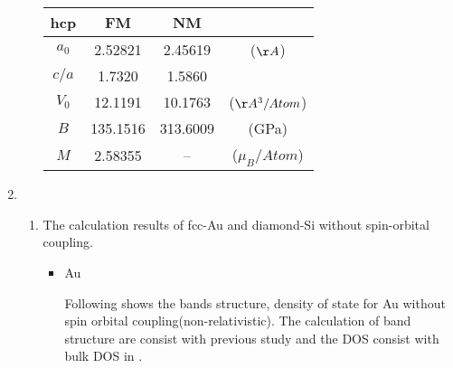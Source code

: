 \documentclass[notitlepage]{revtex4-1}
\begin{document}
\begin{CJK}{UTF8}{bsmi}
\begin{enumerate}
\begin{enumerate}[label=(\alph*)]
		\begin{table}[h!]
			\centering
			\begin{tabular}{c@{\hskip 0.5in}c@{\hskip 0.5in}c@{\hskip 0.5in}c} 
				\hline
				hcp & FM & NM & \\ 
				\hline
				$a_0$   & 2.52821   & 2.45619 &($\AA$)\\
				$c/a$   & 1.7320   & 1.5860 &\\
				$V_0$   & 12.1191  & 10.1763 &($\AA^3/Atom$)\\
				$B$     & 135.1516  & 313.6009 &(GPa)  \\
				$M$     & 2.58355  & -- & ($\mu_B/Atom$) \\
				\hline
			\end{tabular}
			\label{table:hcpall}
		\end{table}
	
	\end{enumerate} 
	\clearpage
	
	\item 
	\begin{enumerate}[label=(\alph*)]
		\item The calculation results of fcc-Au and diamond-Si without spin-orbital coupling. 
		\begin{itemize}
			\item Au
			
				Following shows the bands structure, density of state for Au without spin orbital coupling(non-relativistic). The calculation of band structure are consist with previous study \cite{JoPAu} and the DOS consist with bulk DOS in \cite{photonics2020659}. 
				 
			 	\begin{figure}[h!]
				

\end{figure}
\end{itemize}
\end{enumerate}
\end{enumerate}
\end{CJK}
\end{document}

